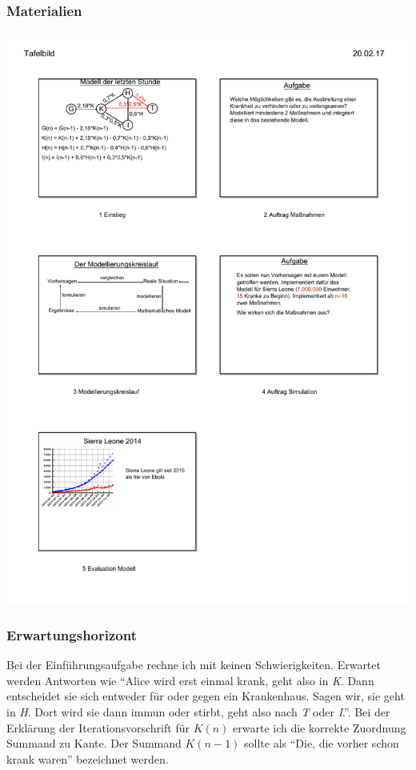 \subsubsection{Materialien}
\includegraphics[width=\textwidth]{projekt/Tafelbild_3_c}
\subsubsection{Erwartungshorizont}
Bei der Einführungsaufgabe rechne ich mit keinen Schwierigkeiten. Erwartet werden Antworten wie ``Alice wird erst einmal krank, geht also in \emph{K}. Dann entscheidet sie sich entweder für oder gegen ein Krankenhaus. Sagen wir, sie geht in \emph{H}. Dort wird sie dann immun oder stirbt, geht also nach \emph{T} oder \emph{I}.''. Bei der Erklärung der Iterationsvorschrift für $K(n)$ erwarte ich die korrekte Zuordnung Summand zu Kante. Der Summand $K(n-1)$ sollte als ``Die, die vorher schon krank waren'' bezeichnet werden.

